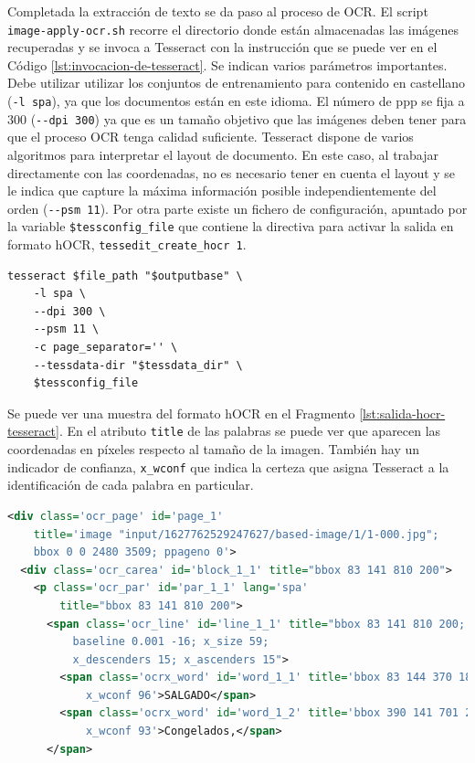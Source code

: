 Completada la extracción de texto se da paso al proceso de OCR. El script \verb|image-apply-ocr.sh| recorre el directorio donde están almacenadas las imágenes recuperadas y se invoca a Tesseract con la instrucción que se puede ver en el Código \ref{lst:invocacion-de-tesseract}. Se indican varios parámetros importantes. Debe utilizar utilizar los conjuntos de entrenamiento para contenido en castellano (\verb|-l spa|), ya que los documentos están en este idioma. El número de \acrlong{ppp} se fija a 300 (\verb|--dpi 300|) ya que es un tamaño objetivo que las imágenes deben tener para que el proceso OCR tenga calidad suficiente. Tesseract dispone de varios algoritmos para interpretar el layout de documento. En este caso, al trabajar directamente con las coordenadas, no es necesario tener en cuenta el layout y se le indica que capture la máxima información posible independientemente del orden (\verb|--psm 11|). Por otra parte existe un fichero de configuración, apuntado por la variable \verb|$tessconfig_file| que contiene la directiva para activar la salida en formato hOCR, \verb|tessedit_create_hocr 1|.

\begin{lstlisting}[language=XML,caption={Extracción de texto con información de coordenadas.},label=lst:invocacion-de-tesseract]
tesseract $file_path "$outputbase" \
    -l spa \
    --dpi 300 \
    --psm 11 \
    -c page_separator='' \
    --tessdata-dir "$tessdata_dir" \
    $tessconfig_file
\end{lstlisting}

Se puede ver una muestra del formato hOCR en el Fragmento \ref{lst:salida-hocr-tesseract}. En el atributo \verb|title| de las palabras se puede ver que aparecen las coordenadas en píxeles respecto al tamaño de la imagen. También hay un indicador de confianza, \verb|x_wconf| que indica la certeza que asigna Tesseract a la identificación de cada palabra en particular.

\begin{lstlisting}[language=XML,caption={Fragmento de la salida hOCR de Tesseract.},label=lst:salida-hocr-tesseract]
<div class='ocr_page' id='page_1' 
    title='image "input/1627762529247627/based-image/1/1-000.jpg"; 
    bbox 0 0 2480 3509; ppageno 0'>
  <div class='ocr_carea' id='block_1_1' title="bbox 83 141 810 200">
    <p class='ocr_par' id='par_1_1' lang='spa' 
        title="bbox 83 141 810 200">
      <span class='ocr_line' id='line_1_1' title="bbox 83 141 810 200; 
          baseline 0.001 -16; x_size 59; 
          x_descenders 15; x_ascenders 15">
        <span class='ocrx_word' id='word_1_1' title='bbox 83 144 370 185; 
            x_wconf 96'>SALGADO</span>
        <span class='ocrx_word' id='word_1_2' title='bbox 390 141 701 200; 
            x_wconf 93'>Congelados,</span>
      </span>
\end{lstlisting}

